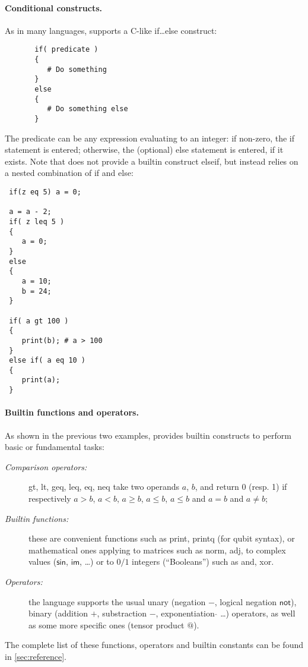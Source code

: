 \paragraph{Conditional constructs.} As in many languages, \QL supports a C-like \textsf{if}\dots\textsf{else} construct:
\begin{lstlisting}
       if( predicate )
       {
          # Do something
       }
       else
       {
          # Do something else
       }
\end{lstlisting}
The predicate can be any expression evaluating to an integer: if non-zero, the \textsf{if} statement is entered; otherwise, the (optional) \textsf{else} statement is entered, if it exists. Note that \QL does not provide a builtin construct \textsf{elseif}, but instead relies on a nested combination of \textsf{if} and \textsf{else}:
\begin{lstlisting}
 if(z eq 5) a = 0;
       
 a = a - 2;
 if( z leq 5 )
 {
    a = 0;
 }
 else
 {
    a = 10;
    b = 24;
 }
       
 if( a gt 100 )
 {
    print(b); # a > 100
 }
 else if( a eq 10 )
 {
    print(a);
 }
\end{lstlisting}

\paragraph{Builtin functions and operators.} As shown in the previous two examples, \QL provides builtin constructs to perform basic or fundamental tasks:
\begin{description}
  \item[\rm\em Comparison operators:] \textsf{gt}, \textsf{lt}, \textsf{geq}, \textsf{leq}, \textsf{eq}, \textsf{neq} take two operands $a$, $b$, and return 0 (resp. 1) if respectively $a > b$, $a < b$, $a \geq b$, $a \leq b$, $a \leq b$ and $a = b$ and $a \neq b$;
  \item[\rm\em Builtin functions:] these are convenient functions such as \textsf{print}, \textsf{printq} (for qubit syntax), or mathematical ones applying to matrices such as \textsf{norm}, \textsf{adj}, to complex values ($\textsf{sin}$, $\textsf{im}$, \dots) or to $0/1$ integers (``Booleans'') such as \textsf{and}, \textsf{xor}.
  \item[\rm\em Operators:] the language supports the usual unary (negation $-$, logical negation $\textsf{not}$), binary (addition $+$, substraction $-$, exponentiation $\hat{}$ \dots) operators, as well as some more specific ones (tensor product $@$).
\end{description}
The complete list of these functions, operators and builtin constants can be found in \autoref{sec:reference}.

